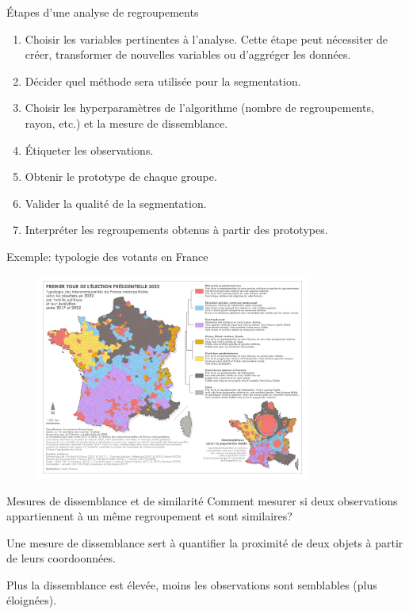 \documentclass[
  ignorenonframetext,
]{beamer}
\providecommand{\tightlist}{%
  \setlength{\itemsep}{0pt}\setlength{\parskip}{0pt}}\usepackage{longtable,booktabs,array}
\begin{document}
\begin{frame}{Étapes d'une analyse de regroupements}
\protect\hypertarget{uxe9tapes-dune-analyse-de-regroupements}{}
\begin{enumerate}
\tightlist
\item
  Choisir les variables pertinentes à l'analyse. Cette étape peut
  nécessiter de créer, transformer de nouvelles variables ou d'aggréger
  les données.
\item
  Décider quel méthode sera utilisée pour la segmentation.
\item
  Choisir les hyperparamètres de l'algorithme (nombre de regroupements,
  rayon, etc.) et la mesure de dissemblance.
\item
  Étiqueter les observations.
\item
  Obtenir le prototype de chaque groupe.
\item
  Valider la qualité de la segmentation.
\item
  Interpréter les regroupements obtenus à partir des prototypes.
\end{enumerate}
\end{frame}

\begin{frame}{Exemple: typologie des votants en France}
\protect\hypertarget{exemple-typologie-des-votants-en-france}{}
\begin{figure}

{\centering \includegraphics[width=0.8\textwidth,height=\textheight]{figures/typologie-vote-france.jpg}

}

\end{figure}
\end{frame}

\begin{frame}{Mesures de dissemblance et de similarité}
\protect\hypertarget{mesures-de-dissemblance-et-de-similarituxe9}{}
Comment mesurer si deux observations appartiennent à un même
regroupement et sont similaires?

Une mesure de dissemblance sert à quantifier la proximité de deux objets
à partir de leurs coordoonnées.

Plus la dissemblance est élevée, moins les observations sont semblables
(plus éloignées).
\end{frame}
\end{document}
